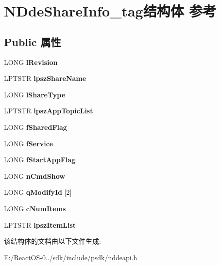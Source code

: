 \hypertarget{struct_n_dde_share_info__tag}{}\section{N\+Dde\+Share\+Info\+\_\+tag结构体 参考}
\label{struct_n_dde_share_info__tag}
\subsection*{Public 属性}
\begin{DoxyCompactItemize}
\item 
\mbox{\label{struct_n_dde_share_info__tag_a243cb4e0913be3bc02be858ba25d23a1}} 
L\+O\+NG {\bfseries l\+Revision}
\item 
\mbox{\label{struct_n_dde_share_info__tag_a73c5ffe73dca25b8fd3fc89e98703e4c}} 
L\+P\+T\+S\+TR {\bfseries lpsz\+Share\+Name}
\item 
\mbox{\label{struct_n_dde_share_info__tag_ac06c421650212d6afd2b8a0da79e466c}} 
L\+O\+NG {\bfseries l\+Share\+Type}
\item 
\mbox{\label{struct_n_dde_share_info__tag_a52f547142b45fb68888ef537a6bc496f}} 
L\+P\+T\+S\+TR {\bfseries lpsz\+App\+Topic\+List}
\item 
\mbox{\label{struct_n_dde_share_info__tag_ac6d565dfeede71bab5dec4273bf2b4b0}} 
L\+O\+NG {\bfseries f\+Shared\+Flag}
\item 
\mbox{\label{struct_n_dde_share_info__tag_a4892245306e76e635bfaee958d46f648}} 
L\+O\+NG {\bfseries f\+Service}
\item 
\mbox{\label{struct_n_dde_share_info__tag_add417a71d2325ccb2138207c8fd31575}} 
L\+O\+NG {\bfseries f\+Start\+App\+Flag}
\item 
\mbox{\label{struct_n_dde_share_info__tag_a79a89ffbcaa67b8fa3c801d93f5a74b6}} 
L\+O\+NG {\bfseries n\+Cmd\+Show}
\item 
\mbox{\label{struct_n_dde_share_info__tag_a57f7522299f4e809a757420ef0f6bd33}} 
L\+O\+NG {\bfseries q\+Modify\+Id} \mbox{[}2\mbox{]}
\item 
\mbox{\label{struct_n_dde_share_info__tag_a6abe963045ee75b89e332d71f06c117e}} 
L\+O\+NG {\bfseries c\+Num\+Items}
\item 
\mbox{\label{struct_n_dde_share_info__tag_af1e3b10ac2304e5528190bc55585fda6}} 
L\+P\+T\+S\+TR {\bfseries lpsz\+Item\+List}
\end{DoxyCompactItemize}


该结构体的文档由以下文件生成\+:\begin{DoxyCompactItemize}
\item 
E\+:/\+React\+O\+S-\/0../sdk/include/psdk/nddeapi.\+h\end{DoxyCompactItemize}
